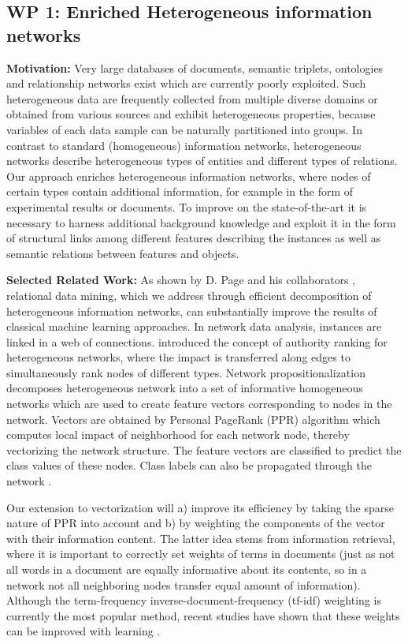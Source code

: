 \documentclass[a4paper,11pt]{article}
\begin{document}
\subsection{WP 1: Enriched Heterogeneous information networks}
\textbf{Motivation:}
Very large databases of documents, semantic triplets, ontologies and relationship networks exist which are currently poorly exploited. Such heterogeneous data are frequently collected from multiple diverse domains or obtained from various sources and exhibit heterogeneous properties, because variables of each data sample can be naturally partitioned into groups. In contrast to standard (homogeneous) information networks, heterogeneous networks describe heterogeneous types of entities and different types of relations. Our approach enriches heterogeneous information networks, where nodes of certain types contain additional information, for example in the form of experimental results or documents. To improve on the state-of-the-art it is necessary to harness additional background knowledge and exploit it in the form of structural links among different features describing the instances as well as semantic relations between features and objects.
 
\textbf{Selected Related Work:}
As shown by D. Page and his collaborators \citep{PageDavid:2012:RelationalLearning,Peissig2014}, relational data mining, which we address through efficient decomposition of heterogeneous information networks, can substantially improve the results of classical machine learning approaches.
In network data analysis, instances are linked in a web of connections.  \citet{thebook} introduced the concept of authority ranking for heterogeneous networks, where the impact is transferred along edges to simultaneously rank nodes of different types.
Network propositionalization \citep{grcar2012} decomposes heterogeneous network into a set of informative homogeneous networks which are used to create feature vectors corresponding to nodes in the network. Vectors are obtained by  Personal PageRank (PPR) algorithm which computes local impact of neighborhood for each network node, thereby vectorizing the network structure. The feature vectors are classified to predict the class values of these nodes. Class labels can also be propagated through the network \citep{vanunu2010}.

Our extension to vectorization will a) improve its efficiency by taking the sparse nature of PPR  into account and b) by weighting the components of the vector with their information content. The latter idea stems from information retrieval, where it is important to correctly set weights of  terms in documents (just as not all words in a document are equally informative about its contents, so in a network not all neighboring nodes transfer equal amount of information). Although the term-frequency inverse-document-frequency (tf-idf) weighting is currently the most popular method, recent studies have shown that these weights can be improved with learning \citep{Kim2016}. 
\end{document}
